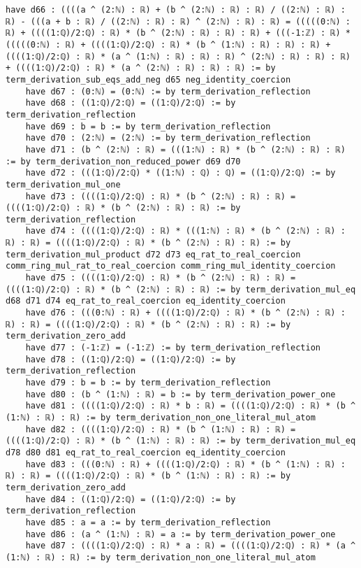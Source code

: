 \documentclass{article}
\begin{document}
\begin{tcolorbox}[colback=white!10, width=\linewidth]
\begin{lstlisting}[language=Lean4]
    have d66 : ((((a ^ (2:ℕ) : ℝ) + (b ^ (2:ℕ) : ℝ) : ℝ) / ((2:ℕ) : ℝ) : ℝ) - (((a + b : ℝ) / ((2:ℕ) : ℝ) : ℝ) ^ (2:ℕ) : ℝ) : ℝ) = (((((0:ℕ) : ℝ) + ((((1:ℚ)/2:ℚ) : ℝ) * (b ^ (2:ℕ) : ℝ) : ℝ) : ℝ) + (((-1:ℤ) : ℝ) * (((((0:ℕ) : ℝ) + ((((1:ℚ)/2:ℚ) : ℝ) * (b ^ (1:ℕ) : ℝ) : ℝ) : ℝ) + ((((1:ℚ)/2:ℚ) : ℝ) * (a ^ (1:ℕ) : ℝ) : ℝ) : ℝ) ^ (2:ℕ) : ℝ) : ℝ) : ℝ) + ((((1:ℚ)/2:ℚ) : ℝ) * (a ^ (2:ℕ) : ℝ) : ℝ) : ℝ) := by term_derivation_sub_eqs_add_neg d65 neg_identity_coercion
    have d67 : (0:ℕ) = (0:ℕ) := by term_derivation_reflection
    have d68 : ((1:ℚ)/2:ℚ) = ((1:ℚ)/2:ℚ) := by term_derivation_reflection
    have d69 : b = b := by term_derivation_reflection
    have d70 : (2:ℕ) = (2:ℕ) := by term_derivation_reflection
    have d71 : (b ^ (2:ℕ) : ℝ) = (((1:ℕ) : ℝ) * (b ^ (2:ℕ) : ℝ) : ℝ) := by term_derivation_non_reduced_power d69 d70
    have d72 : (((1:ℚ)/2:ℚ) * ((1:ℕ) : ℚ) : ℚ) = ((1:ℚ)/2:ℚ) := by term_derivation_mul_one
    have d73 : ((((1:ℚ)/2:ℚ) : ℝ) * (b ^ (2:ℕ) : ℝ) : ℝ) = ((((1:ℚ)/2:ℚ) : ℝ) * (b ^ (2:ℕ) : ℝ) : ℝ) := by term_derivation_reflection
    have d74 : ((((1:ℚ)/2:ℚ) : ℝ) * (((1:ℕ) : ℝ) * (b ^ (2:ℕ) : ℝ) : ℝ) : ℝ) = ((((1:ℚ)/2:ℚ) : ℝ) * (b ^ (2:ℕ) : ℝ) : ℝ) := by term_derivation_mul_product d72 d73 eq_rat_to_real_coercion comm_ring_mul_rat_to_real_coercion comm_ring_mul_identity_coercion
    have d75 : ((((1:ℚ)/2:ℚ) : ℝ) * (b ^ (2:ℕ) : ℝ) : ℝ) = ((((1:ℚ)/2:ℚ) : ℝ) * (b ^ (2:ℕ) : ℝ) : ℝ) := by term_derivation_mul_eq d68 d71 d74 eq_rat_to_real_coercion eq_identity_coercion
    have d76 : (((0:ℕ) : ℝ) + ((((1:ℚ)/2:ℚ) : ℝ) * (b ^ (2:ℕ) : ℝ) : ℝ) : ℝ) = ((((1:ℚ)/2:ℚ) : ℝ) * (b ^ (2:ℕ) : ℝ) : ℝ) := by term_derivation_zero_add
    have d77 : (-1:ℤ) = (-1:ℤ) := by term_derivation_reflection
    have d78 : ((1:ℚ)/2:ℚ) = ((1:ℚ)/2:ℚ) := by term_derivation_reflection
    have d79 : b = b := by term_derivation_reflection
    have d80 : (b ^ (1:ℕ) : ℝ) = b := by term_derivation_power_one
    have d81 : ((((1:ℚ)/2:ℚ) : ℝ) * b : ℝ) = ((((1:ℚ)/2:ℚ) : ℝ) * (b ^ (1:ℕ) : ℝ) : ℝ) := by term_derivation_non_one_literal_mul_atom
    have d82 : ((((1:ℚ)/2:ℚ) : ℝ) * (b ^ (1:ℕ) : ℝ) : ℝ) = ((((1:ℚ)/2:ℚ) : ℝ) * (b ^ (1:ℕ) : ℝ) : ℝ) := by term_derivation_mul_eq d78 d80 d81 eq_rat_to_real_coercion eq_identity_coercion
    have d83 : (((0:ℕ) : ℝ) + ((((1:ℚ)/2:ℚ) : ℝ) * (b ^ (1:ℕ) : ℝ) : ℝ) : ℝ) = ((((1:ℚ)/2:ℚ) : ℝ) * (b ^ (1:ℕ) : ℝ) : ℝ) := by term_derivation_zero_add
    have d84 : ((1:ℚ)/2:ℚ) = ((1:ℚ)/2:ℚ) := by term_derivation_reflection
    have d85 : a = a := by term_derivation_reflection
    have d86 : (a ^ (1:ℕ) : ℝ) = a := by term_derivation_power_one
    have d87 : ((((1:ℚ)/2:ℚ) : ℝ) * a : ℝ) = ((((1:ℚ)/2:ℚ) : ℝ) * (a ^ (1:ℕ) : ℝ) : ℝ) := by term_derivation_non_one_literal_mul_atom

\end{lstlisting}
\end{tcolorbox}
\end{document}
